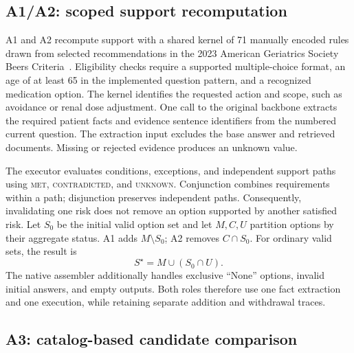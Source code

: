 \subsection{A1/A2: scoped support recomputation}

A1 and A2 recompute support with a shared kernel of 71 manually encoded rules drawn from selected recommendations in the 2023 American Geriatrics Society Beers Criteria~\citep{ags2023beers}. Eligibility checks require a supported multiple-choice format, an age of at least 65 in the implemented question pattern, and a recognized medication option. The kernel identifies the requested action and scope, such as avoidance or renal dose adjustment. One call to the original backbone extracts the required patient facts and evidence sentence identifiers from the numbered current question. The extraction input excludes the base answer and retrieved documents. Missing or rejected evidence produces an unknown value.

The executor evaluates conditions, exceptions, and independent support paths using \textsc{met}, \textsc{contradicted}, and \textsc{unknown}. Conjunction combines requirements within a path; disjunction preserves independent paths. Consequently, invalidating one risk does not remove an option supported by another satisfied risk. Let $S_0$ be the initial valid option set and let $M,C,U$ partition options by their aggregate status. A1 adds $M\setminus S_0$; A2 removes $C\cap S_0$. For ordinary valid sets, the result is
\begin{equation}
 S^{\star}=M\cup(S_0\cap U).
 \label{eq:support-update}
\end{equation}
The native assembler additionally handles exclusive ``None'' options, invalid initial answers, and empty outputs. Both roles therefore use one fact extraction and one execution, while retaining separate addition and withdrawal traces.

\subsection{A3: catalog-based candidate comparison}

